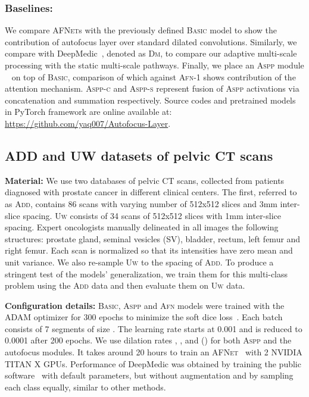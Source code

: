 \documentclass{llncs}
\newcommand{\afn}{\textsc{AFNet}}
\begin{document}
\subsubsection{Baselines:} We compare \afn{}s with the previously defined \textsc{Basic} model to show the contribution of autofocus layer over standard dilated convolutions. Similarly, we compare with DeepMedic~\cite{Kamnitsas2017EfficientM3}, denoted as \textsc{Dm}, to compare our adaptive multi-scale processing with the static multi-scale pathways. Finally, we place an \textsc{Aspp} module ~\cite{chen2016deeplab} on top of \textsc{Basic}, comparison of which against \textsc{Afn}-1 shows contribution of the attention mechanism. \textsc{Aspp-c} and \textsc{Aspp-s} represent fusion of \textsc{Aspp} activations via concatenation and summation respectively. Source codes and pretrained models in PyTorch framework are online available at: \url{https://github.com/yaq007/Autofocus-Layer}.

\vspace{-4mm}
\subsection{ADD and UW datasets of pelvic CT scans }
\label{subsec:ct_data}
\vspace{-2mm}
\textbf{Material:} We use two databases of pelvic CT scans, collected from patients diagnosed with prostate cancer in different clinical centers. The first, referred to as \textsc{Add}, contains 86 scans with varying number of 512x512 slices and 3mm inter-slice spacing. \textsc{Uw} consists of 34 scans of 512x512 slices with 1mm inter-slice spacing. Expert oncologists manually delineated in all images the following structures: prostate gland, seminal vesicles (SV), bladder, rectum, left femur and right femur. Each scan is normalized so that its intensities have zero mean and unit variance. We also re-sample \textsc{Uw} to the spacing of \textsc{Add}. To produce a stringent test of the models' generalization, we train them for this multi-class problem using the \textsc{Add} data and then evaluate them on \textsc{Uw} data.

\textbf{Configuration details:} \textsc{Basic}, \textsc{Aspp} and \textsc{Afn} models were trained with the ADAM optimizer for 300 epochs to minimize the soft dice loss~\cite{milletari2016v}. Each batch consists of 7 segments of size . The learning rate starts at 0.001 and is reduced to 0.0001 after 200 epochs. We use dilation rates , ,  and  () for both \textsc{Aspp} and the autofocus modules. It takes around 20 hours to train an \afn~ with 2 NVIDIA TITAN X GPUs. Performance of DeepMedic was obtained by training the public software~\cite{Kamnitsas2017EfficientM3} with default parameters, but without augmentation and by sampling each class equally, similar to other methods.
\end{document}
